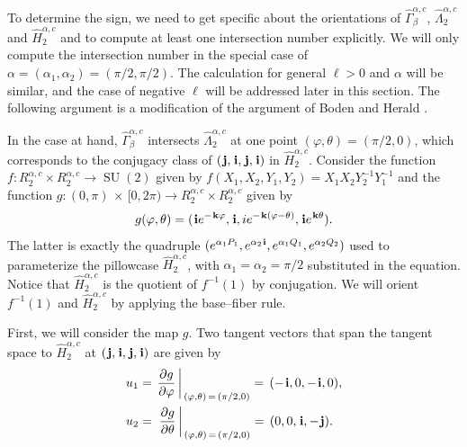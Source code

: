 \documentclass[11pt,reqno]{amsart}
\theoremstyle{definition}
\renewcommand{\phi}{\varphi}
\renewcommand{\i}{\mspace{1.5mu}\mathbf i}
\renewcommand{\j}{\mspace{1.5mu}\mathbf j}
\renewcommand{\k}{\mspace{1.5mu}\mathbf k}
\newcommand{\SU}{\operatorname{SU}}
\begin{document}
\begin{sloppypar}
To determine the sign, we need to get specific about the orientations of $\widehat{\Gamma}_{\beta}^{\alpha,c}$, $\widehat{\Lambda}_2^{\alpha, c}$ and $\widehat{H}_2^{\alpha, c}$ and to compute at least one intersection number explicitly. We will only compute the intersection number in the special case of $\alpha = (\alpha_1, \alpha_2) = (\pi/2, \pi/2)$. The calculation for general $\ell > 0$ and $\alpha$ will be similar, and the case of negative $\ell$ will be addressed later in this section. The following argument is a modification of the argument of Boden and Herald \cite {Boden-Herald}.

In the case at hand, $\widehat{\Gamma}_{\beta}^{\alpha,c}$ intersects $\widehat{\Lambda}_2^{\alpha, c}$ at one point $(\phi, \theta) = (\pi / 2, 0)$, which corresponds to the conjugacy class of $(\j, \i, \j, \i)$ in $\widehat{H}_2^{\alpha, c}$. Consider the function $f: R_2^{\alpha, c} \times R_2^{\alpha, c} \to \SU(2)$ given by $f(X_1, X_2, Y_1, Y_2) = X_1 X_2 Y_2^{- 1} Y_1^{- 1}$ and the function $g: (0, \pi)\, \times\, [0, 2 \pi) \to R_2^{\alpha, c}\times R_2^{\alpha, c}$ given by
\[
g(\phi, \theta) = (\i e^{- \k \phi}, \i, i e^{- \k (\phi - \theta)}, \i e^{\k \theta}).
\]
The latter is exactly the quadruple $(e^{\alpha_1 P_1}, e^{\alpha_2 \i}, e^{\alpha_1 Q_1}, e^{\alpha_2 Q_2})$ used to parameterize the pillowcase $\widehat{H}_2^{\alpha, c}$, with $\alpha_1 = \alpha_2 = \pi / 2$ substituted in the equation. Notice that $\widehat{H}_2^{\alpha, c} $ is the quotient of $f^{-1}(1)$ by conjugation. We will orient $f^{-1}(1)$ and $\widehat{H}_2^{\alpha, c}$ by applying the base--fiber rule. 

First, we will consider the map $g$. Two tangent vectors that span the tangent space to $\widehat{H}_2^{\alpha, c}$ at $(\j, \i, \j, \i)$ are given by
\[
\begin{aligned}
u_1 & = \left. \frac{\partial g}{\partial \phi}\, \right\vert_{\,(\phi,\theta)\, =\, ({\pi}/{2}, 0)} =\, (- \i, 0, - \i, 0), \\
u_2 & = \left. \,\frac{\partial g}{\partial \theta}\, \right\vert_{\,(\phi,\theta)\, =\, ({\pi}/{2}, 0)} =\, (0, 0, \i, - \j).
\end{aligned}
\]


\end{sloppypar}
\end{document}
